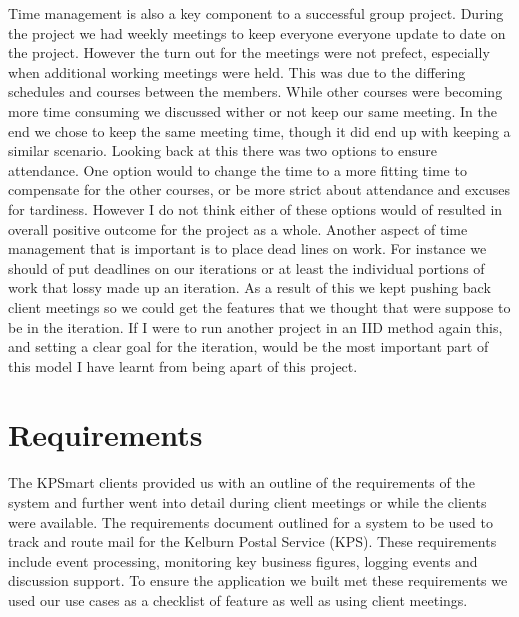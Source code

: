 \documentclass{style/CRPITStyle}
\begin{document}
Time management is also a key component to a successful group project.
During the project we had weekly meetings to keep everyone everyone update to
date on the project. However the turn out for the meetings were not prefect,
especially when additional working meetings were held. This was
due to the differing schedules and courses between the members. While other
courses were becoming more time consuming we discussed wither or not keep our
same meeting. In the end we chose to keep the same meeting time, though it did
end up with keeping a similar scenario. Looking back at this there was two
options to ensure attendance. One option would to change the time to a more
fitting time to compensate for the other courses, or be more strict about
attendance and excuses for tardiness. However I do not think either of these
options would of resulted in overall positive outcome for the project as a
whole. Another aspect of time management that is important is to place dead
lines on work. For instance we should of put deadlines on our iterations or at
least the individual portions of work that lossy made up an iteration. As a
result of this we kept pushing back client meetings so we could get the features
that we thought that were suppose to be in the iteration. If I were to run
another project in an IID method again this, and setting a clear goal for the
iteration, would be the most important part of this model I have learnt from
being apart of this project.

\section{Requirements}

The KPSmart clients provided us with an outline of the requirements of the
system and further went into detail during client meetings or while the clients
were available. The requirements document outlined for a system to be used to
track and route mail for the Kelburn Postal Service (KPS). These requirements
include event processing, monitoring key business figures, logging events and
discussion support. To ensure the application we built met these requirements we
used our use cases as a checklist of feature as well as using client meetings.
\end{document}
